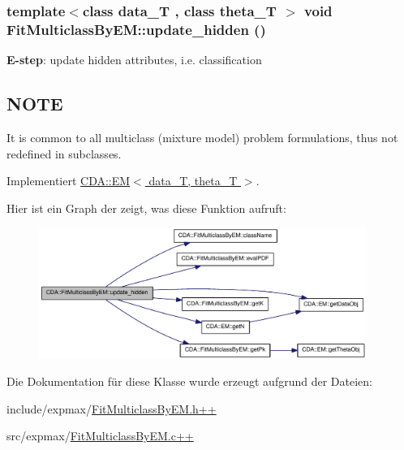 \hypertarget{classCDA_1_1FitMulticlassByEM_a7c40c5528a4b8b32e2455056f60d76de}{
\subsubsection[{update\_\-hidden}]{\setlength{\rightskip}{0pt plus 5cm}template$<$class data\_\-T , class theta\_\-T $>$ void FitMulticlassByEM::update\_\-hidden ()}}
\label{classCDA_1_1FitMulticlassByEM_a7c40c5528a4b8b32e2455056f60d76de}


{\bfseries E-\/step}: update hidden attributes, i.e. classification 

\hypertarget{GaussianMixtureModel1D_8h_09_09_NOTE}{}\subsection{NOTE}\label{GaussianMixtureModel1D_8h_09_09_NOTE}
It is common to all multiclass (mixture model) problem formulations, thus not redefined in subclasses. 

Implementiert \hyperlink{classCDA_1_1EM_a587d80945cad21df1233dc22cb95671d}{CDA::EM$<$ data\_\-T, theta\_\-T $>$}.



Hier ist ein Graph der zeigt, was diese Funktion aufruft:\nopagebreak
\begin{figure}[H]
\begin{center}
\leavevmode
\includegraphics[width=303pt]{classCDA_1_1FitMulticlassByEM_a7c40c5528a4b8b32e2455056f60d76de_cgraph}
\end{center}
\end{figure}




Die Dokumentation für diese Klasse wurde erzeugt aufgrund der Dateien:\begin{DoxyCompactItemize}
\item 
include/expmax/\hyperlink{FitMulticlassByEM_8h_09_09}{FitMulticlassByEM.h++}\item 
src/expmax/\hyperlink{FitMulticlassByEM_8c_09_09}{FitMulticlassByEM.c++}\end{DoxyCompactItemize}
